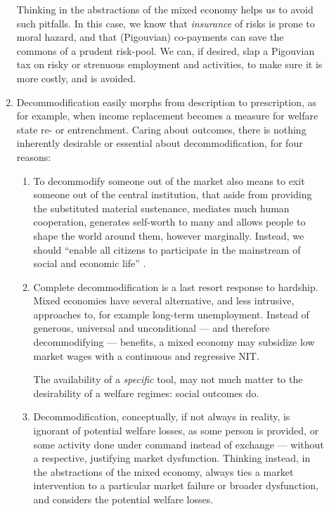 \begin{description}
\begin{enumerate}
		Thinking in the abstractions of the mixed economy helps us to avoid such pitfalls.
		In this case, we know that \emph{insurance} of risks is prone to moral hazard, and that (Pigouvian) co-payments can save the commons of a prudent risk-pool.
		We can, if desired, slap a Pigouvian tax on risky or strenuous employment and activities, to make sure it is more costly, and is avoided.

		\item Decommodification easily morphs from description to prescription, as for example, when income replacement becomes a measure for welfare state re- or entrenchment.
		Caring about outcomes, there is nothing inherently desirable or essential about decommodification, for four reasons:

			\begin{enumerate}
				\item To decommodify someone out of the market also means to exit someone out of the central institution, that aside from providing the substituted material sustenance, mediates much human cooperation, generates self-worth to many and allows people to shape the world around them, however marginally.
				Instead, we should ``enable all citizens to participate in the mainstream of social and economic life'' \citep[ix]{Esping-Andersen2002}.

				\item Complete decommodification is a last resort response to hardship.
				Mixed economies have several alternative, and less intrusive, approaches to, for example long-term unemployment.
				Instead of generous, universal and unconditional --- and therefore decommodifying --- benefits, a mixed economy may subsidize low market wages with a continuous and regressive \gls{NIT}.

				The availability of a \emph{specific} tool, may not much matter to the desirability of a welfare regimes:
				social outcomes do.

				\item Decommodification, conceptually, if not always in reality, is ignorant of potential welfare losses, as some person is provided, or some activity done under command instead of exchange --- without a respective, justifying market dysfunction.
				Thinking instead, in the abstractions of the mixed economy, always ties a market intervention to a particular market failure or broader dysfunction, and considers the potential welfare losses.
			\end{enumerate}


\end{enumerate}
\end{description}
